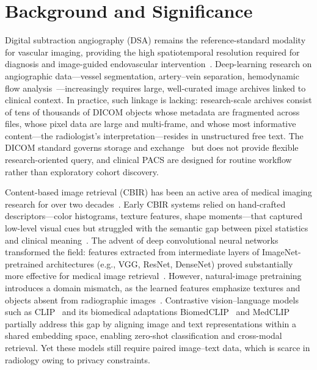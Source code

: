 \documentclass[11pt]{article}
\begin{document}
\section{Background and Significance}

Digital subtraction angiography (DSA) remains the reference-standard modality
for vascular imaging, providing the high spatiotemporal resolution required for
diagnosis and image-guided endovascular
intervention~\cite{hill2007dsa,crummy2018history}. Deep-learning research on
angiographic data---vessel segmentation, artery--vein separation, hemodynamic
flow analysis~\cite{zhang2020nndsa}---increasingly requires large, well-curated
image archives linked to clinical context. In practice, such linkage is lacking:
research-scale archives consist of tens of thousands of DICOM objects whose
metadata are fragmented across files, whose pixel data are large and
multi-frame, and whose most informative content---the radiologist's
interpretation---resides in unstructured free text. The DICOM standard governs
storage and exchange~\cite{mildenberger2002dicom,bidgood1997dicom} but does not
provide flexible research-oriented query, and clinical PACS are designed for
routine workflow rather than exploratory cohort discovery.

Content-based image retrieval (CBIR) has been an active area of medical
imaging research for over two decades~\cite{litjens2017survey,muller2004cbir}.
Early CBIR systems relied on hand-crafted descriptors---color histograms,
texture features, shape moments---that captured low-level visual cues but
struggled with the semantic gap between pixel statistics and clinical
meaning~\cite{dubey2021cbir}. The advent of deep convolutional neural networks
transformed the field: features extracted from intermediate layers of
ImageNet-pretrained architectures (e.g., VGG, ResNet, DenseNet) proved
substantially more effective for medical image
retrieval~\cite{ke2021chextransfer,litjens2017survey}. However, natural-image
pretraining introduces a domain mismatch, as the learned features emphasize
textures and objects absent from radiographic
images~\cite{ke2021chextransfer}. Contrastive vision--language models such as
CLIP~\cite{radford2021clip} and its biomedical adaptations
BiomedCLIP~\cite{zhang2023biomedclip} and MedCLIP~\cite{wang2022medclip}
partially address this gap by aligning image and text representations within a
shared embedding space, enabling zero-shot classification and cross-modal
retrieval. Yet these models still require paired image--text data, which is
scarce in radiology owing to privacy constraints.
\end{document}
